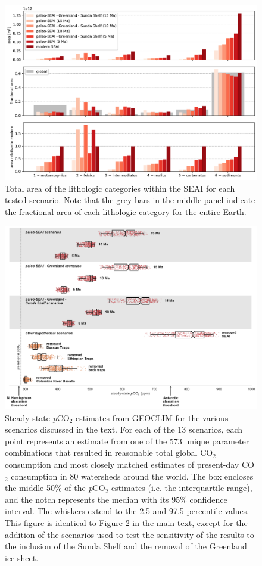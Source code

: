 \documentclass[11pt,letterpaper]{article}
\newcommand{\pCOtwo}{\textit{p}CO$_{2}$\xspace}
\newcommand{\COtwo}{CO$_{2}$\xspace}
\begin{document}
\begin{figure}[h!]
    \centering
    \includegraphics[width=1\textwidth]{Figures/lithology_areas.pdf}
    \caption{Total area of the lithologic categories within the SEAI for each tested scenario. Note that the grey bars in the middle panel indicate the fractional area of each lithologic category for the entire Earth.}
    \label{fig:lithology_areas}
\end{figure}

\begin{figure}[h!]
    \centering
    \includegraphics[width=1\textwidth]{Figures/scenario_pCO2_all.pdf}
    \caption{Steady-state \pCOtwo estimates from GEOCLIM for the various scenarios discussed in the text. For each of the 13 scenarios, each point represents an estimate from one of the 573 unique parameter combinations that resulted in reasonable total global \COtwo consumption and most closely matched estimates of present-day \COtwo consumption in 80 watersheds around the world. The box encloses the middle 50\% of the \pCOtwo estimates (i.e. the interquartile range), and the notch represents the median with its 95\% confidence interval. The whiskers extend to the 2.5 and 97.5 percentile values. This figure is identical to Figure 2 in the main text, except for the addition of the scenarios used to test the sensitivity of the results to the inclusion of the Sunda Shelf and the removal of the Greenland ice sheet.}
    \label{fig:scenario_pCO2_all}
\end{figure}
\end{document}
